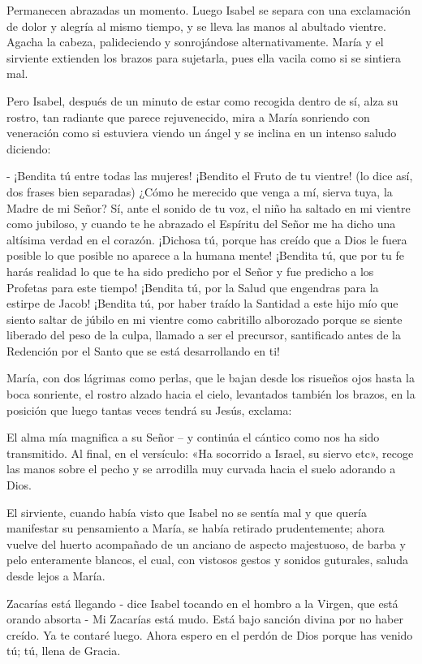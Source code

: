 \documentclass[12pt]{book} %
\begin{document}
Permanecen abrazadas un momento. Luego Isabel se separa con una exclamación de dolor y alegría al mismo tiempo, y se lleva las manos al abultado vientre. Agacha la cabeza, palideciendo y sonrojándose alternativamente. María y el sirviente extienden los brazos para sujetarla, pues ella vacila como si se sintiera mal. 

Pero Isabel, después de un minuto de estar como recogida dentro de sí, alza su rostro, tan radiante que parece rejuvenecido, mira a María sonriendo con veneración como si estuviera viendo un ángel y se inclina en un intenso saludo diciendo: 

- ¡Bendita tú entre todas las mujeres! ¡Bendito el Fruto de tu vientre! (lo dice así, dos frases bien separadas) ¿Cómo he merecido que venga a mí, sierva tuya, la Madre de mi Señor? Sí, ante el sonido de tu voz, el niño ha saltado en mi vientre como jubiloso, y cuando te he abrazado el Espíritu del Señor me ha dicho una altísima verdad en el corazón. ¡Dichosa tú, porque has creído que a Dios le fuera posible lo que posible no aparece a la humana mente! ¡Bendita tú, que por tu fe harás realidad lo que te ha sido predicho por el Señor y fue predicho a los Profetas para este tiempo! ¡Bendita tú, por la Salud que engendras para la estirpe de Jacob! ¡Bendita tú, por haber traído la Santidad a este hijo mío que siento saltar de júbilo en mi vientre como cabritillo alborozado porque se siente liberado del peso de la culpa, llamado a ser el precursor, santificado antes de la Redención por el Santo que se está desarrollando en ti! 

María, con dos lágrimas como perlas, que le bajan desde los risueños ojos hasta la boca sonriente, el rostro alzado hacia el cielo, levantados también los brazos, en la posición que luego tantas veces tendrá su Jesús, exclama: 

El alma mía magnifica a su Señor – y continúa el cántico como nos ha sido transmitido. Al final, en el versículo: «Ha socorrido a Israel, su siervo etc», recoge las manos sobre el pecho y se arrodilla muy curvada hacia el suelo adorando a Dios. 

El sirviente, cuando había visto que Isabel no se sentía mal y que quería manifestar su pensamiento a María, se había retirado prudentemente; ahora vuelve del huerto acompañado de un anciano de aspecto majestuoso, de barba y pelo enteramente blancos, el cual, con vistosos gestos y sonidos guturales, saluda desde lejos a María. 

Zacarías está llegando - dice Isabel tocando en el hombro a la Virgen, que está orando absorta - Mi Zacarías está mudo. Está bajo sanción divina por no haber creído. Ya te contaré luego. Ahora espero en el perdón de Dios porque has venido tú; tú, llena de Gracia. 
\end{document}
